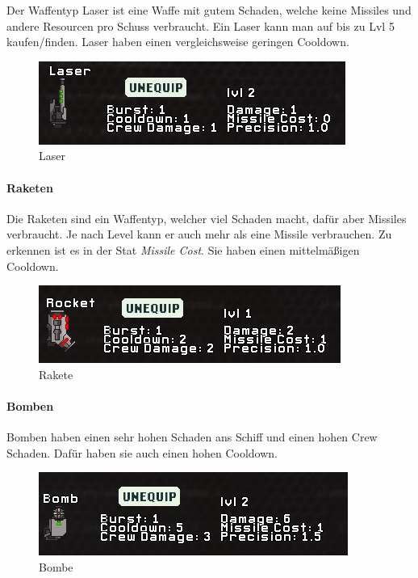 \documentclass[fontsize=12pt,paper=a4,twoside]{scrartcl}
\begin{document}
Der Waffentyp Laser ist eine Waffe mit gutem Schaden, welche keine Missiles und andere Resourcen pro Schuss verbraucht. Ein Laser kann man auf bis zu Lvl 5 kaufen/finden. Laser haben einen vergleichsweise geringen Cooldown. 


\begin{figure}[H]
\centering
\includegraphics[width=1\linewidth]{DasSpiel/Kampf/waffen/laser.png}
\caption{Laser}
\end{figure}


\paragraph{Raketen}

Die Raketen sind ein Waffentyp, welcher viel Schaden macht, dafür aber Missiles verbraucht. Je nach Level kann er auch mehr als eine Missile verbrauchen. Zu erkennen ist es in der Stat \textit{Missile Cost}. Sie haben einen mittelmäßigen Cooldown.

\begin{figure}[H]
\centering
\includegraphics[width=1\linewidth]{DasSpiel/Kampf/waffen/rakete.png}
\caption{Rakete}
\end{figure}

\paragraph{Bomben}

Bomben haben einen sehr hohen Schaden ans Schiff und einen hohen Crew Schaden. Dafür haben sie auch einen hohen Cooldown. 

\begin{figure}[H]
\centering
\includegraphics[width=1\linewidth]{DasSpiel/Kampf/waffen/bomb.png}
\caption{Bombe}
\end{figure}
\end{document}
